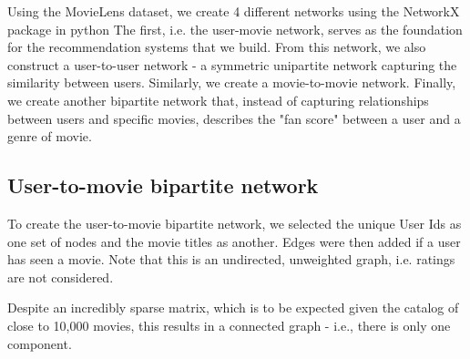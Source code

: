 \documentclass[12pt]{article}
\numberwithin{equation}{section}
\begin{document}
Using the MovieLens dataset, we create 4 different networks using the NetworkX package in python  The first, i.e. the user-movie network, serves as the foundation for the recommendation systems that we build. From this network, we also construct a user-to-user network - a symmetric unipartite network capturing the similarity between users. Similarly, we create a movie-to-movie network. Finally, we create another bipartite network that, instead of capturing relationships between users and specific movies, describes the "fan score" between a user and a genre of movie.

\subsection{User-to-movie bipartite network}

To create the user-to-movie bipartite network, we selected the unique User Ids as one set of nodes and the movie titles as another. Edges were then added if a user has seen a movie. Note that this is an undirected, unweighted graph, i.e. ratings are not considered.

Despite an incredibly sparse matrix, which is to be expected given the catalog of close to 10,000 movies, this results in a connected graph - i.e., there is only one component.
\end{document}
